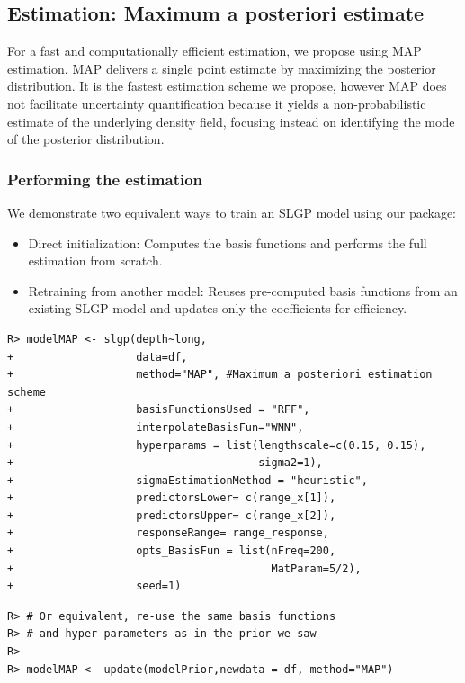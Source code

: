 \documentclass[
]{article}
\begin{document}
\subsection{Estimation: Maximum a posteriori estimate}\label{estimation-maximum-a-posteriori-estimate}

For a fast and computationally efficient estimation, we propose using MAP estimation. MAP delivers a single point estimate by maximizing the posterior distribution. It is the fastest estimation scheme we propose, however MAP does not facilitate uncertainty quantification because it yields a non-probabilistic estimate of the underlying density field, focusing instead on identifying the mode of the posterior distribution.

\subsubsection{Performing the estimation}\label{performing-the-estimation}

We demonstrate two equivalent ways to train an SLGP model using our package:

\begin{itemize}
\item
  Direct initialization: Computes the basis functions and performs the full estimation from scratch.
\item
  Retraining from another model: Reuses pre-computed basis functions from an existing SLGP model and updates only the coefficients for efficiency.
\end{itemize}

\begin{verbatim}
R> modelMAP <- slgp(depth~long, 
+                   data=df,
+                   method="MAP", #Maximum a posteriori estimation scheme
+                   basisFunctionsUsed = "RFF",
+                   interpolateBasisFun="WNN", 
+                   hyperparams = list(lengthscale=c(0.15, 0.15), 
+                                      sigma2=1), 
+                   sigmaEstimationMethod = "heuristic", 
+                   predictorsLower= c(range_x[1]),
+                   predictorsUpper= c(range_x[2]),
+                   responseRange= range_response,
+                   opts_BasisFun = list(nFreq=200,
+                                        MatParam=5/2),
+                   seed=1)
\end{verbatim}

\begin{verbatim}
R> # Or equivalent, re-use the same basis functions 
R> # and hyper parameters as in the prior we saw
R> 
R> modelMAP <- update(modelPrior,newdata = df, method="MAP")
\end{verbatim}
\end{document}

